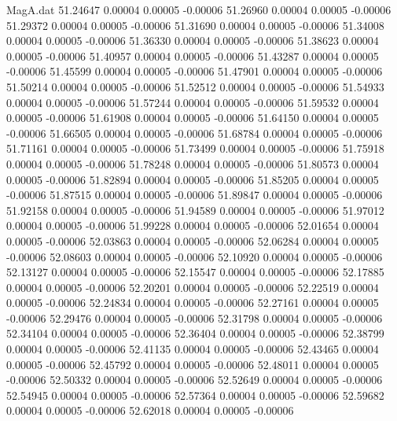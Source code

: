 \begin{filecontents}{MagA.dat}
  51.24647    0.00004    0.00005   -0.00006
  51.26960    0.00004    0.00005   -0.00006
  51.29372    0.00004    0.00005   -0.00006
  51.31690    0.00004    0.00005   -0.00006
  51.34008    0.00004    0.00005   -0.00006
  51.36330    0.00004    0.00005   -0.00006
  51.38623    0.00004    0.00005   -0.00006
  51.40957    0.00004    0.00005   -0.00006
  51.43287    0.00004    0.00005   -0.00006
  51.45599    0.00004    0.00005   -0.00006
  51.47901    0.00004    0.00005   -0.00006
  51.50214    0.00004    0.00005   -0.00006
  51.52512    0.00004    0.00005   -0.00006
  51.54933    0.00004    0.00005   -0.00006
  51.57244    0.00004    0.00005   -0.00006
  51.59532    0.00004    0.00005   -0.00006
  51.61908    0.00004    0.00005   -0.00006
  51.64150    0.00004    0.00005   -0.00006
  51.66505    0.00004    0.00005   -0.00006
  51.68784    0.00004    0.00005   -0.00006
  51.71161    0.00004    0.00005   -0.00006
  51.73499    0.00004    0.00005   -0.00006
  51.75918    0.00004    0.00005   -0.00006
  51.78248    0.00004    0.00005   -0.00006
  51.80573    0.00004    0.00005   -0.00006
  51.82894    0.00004    0.00005   -0.00006
  51.85205    0.00004    0.00005   -0.00006
  51.87515    0.00004    0.00005   -0.00006
  51.89847    0.00004    0.00005   -0.00006
  51.92158    0.00004    0.00005   -0.00006
  51.94589    0.00004    0.00005   -0.00006
  51.97012    0.00004    0.00005   -0.00006
  51.99228    0.00004    0.00005   -0.00006
  52.01654    0.00004    0.00005   -0.00006
  52.03863    0.00004    0.00005   -0.00006
  52.06284    0.00004    0.00005   -0.00006
  52.08603    0.00004    0.00005   -0.00006
  52.10920    0.00004    0.00005   -0.00006
  52.13127    0.00004    0.00005   -0.00006
  52.15547    0.00004    0.00005   -0.00006
  52.17885    0.00004    0.00005   -0.00006
  52.20201    0.00004    0.00005   -0.00006
  52.22519    0.00004    0.00005   -0.00006
  52.24834    0.00004    0.00005   -0.00006
  52.27161    0.00004    0.00005   -0.00006
  52.29476    0.00004    0.00005   -0.00006
  52.31798    0.00004    0.00005   -0.00006
  52.34104    0.00004    0.00005   -0.00006
  52.36404    0.00004    0.00005   -0.00006
  52.38799    0.00004    0.00005   -0.00006
  52.41135    0.00004    0.00005   -0.00006
  52.43465    0.00004    0.00005   -0.00006
  52.45792    0.00004    0.00005   -0.00006
  52.48011    0.00004    0.00005   -0.00006
  52.50332    0.00004    0.00005   -0.00006
  52.52649    0.00004    0.00005   -0.00006
  52.54945    0.00004    0.00005   -0.00006
  52.57364    0.00004    0.00005   -0.00006
  52.59682    0.00004    0.00005   -0.00006
  52.62018    0.00004    0.00005   -0.00006

\end{filecontents}
